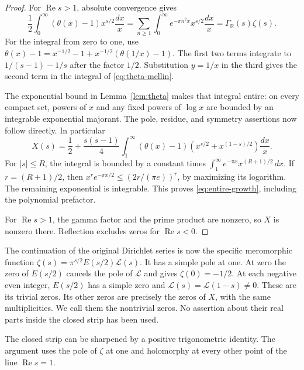 \documentclass[11pt]{article}
\theoremstyle{definition}
\theoremstyle{remark}
\numberwithin{equation}{section}
\newcommand{\R}{\mathbb R}
\begin{document}
\begin{proof}
For $\operatorname{Re}s>1$, absolute convergence gives
\[
 \frac12\int_0^\infty(\theta(x)-1)x^{s/2}\frac{dx}{x}
 =\sum_{n\geq1}\int_0^\infty e^{-\pi n^2x}x^{s/2}\frac{dx}{x}
 =\Gamma_{\R}(s)\zeta(s).
\]
For the integral from zero to one, use
$\theta(x)-1=x^{-1/2}-1+x^{-1/2}(\theta(1/x)-1)$.
The first two terms integrate to $1/(s-1)-1/s$ after the factor $1/2$.
Substitution $y=1/x$ in the third gives the second term in the integral
of \eqref{eq:theta-mellin}.

The exponential bound in Lemma~\ref{lem:theta} makes that integral entire:
on every compact set, powers of $x$ and any fixed powers of $\log x$ are
bounded by an integrable exponential majorant.
The pole, residue, and symmetry assertions now follow directly.
In particular
\[
 X(s)=\frac12+\frac{s(s-1)}4
       \int_1^\infty(\theta(x)-1)
             \left(x^{s/2}+x^{(1-s)/2}\right)\frac{dx}{x}.
\]
For $|s|\leq R$, the integral is bounded by a constant times
$\int_1^\infty e^{-\pi x}x^{(R+1)/2}\,dx$.
If $r=(R+1)/2$, then
$x^r e^{-\pi x/2}\leq(2r/(\pi e))^r$, by maximizing its logarithm.
The remaining exponential is integrable.  This proves
\eqref{eq:entire-growth}, including the polynomial prefactor.

For $\operatorname{Re}s>1$, the gamma factor and the prime product are
nonzero, so $X$ is nonzero there.  Reflection excludes zeros for
$\operatorname{Re}s<0$.
\end{proof}

The continuation of the original Dirichlet series is now the specific
meromorphic function $\zeta(s)=\pi^{s/2}E(s/2)\mathcal L(s)$.
It has a simple pole at one.  At zero the zero of $E(s/2)$ cancels the
pole of $\mathcal L$ and gives $\zeta(0)=-1/2$.
At each negative even integer, $E(s/2)$ has a simple zero and
$\mathcal L(s)=\mathcal L(1-s)\ne0$.
These are its trivial zeros.  Its other zeros are precisely the zeros of
$X$, with the same multiplicities.  We call them the nontrivial zeros.
No assertion about their real parts inside the closed strip has been used.

The closed strip can be sharpened by a positive trigonometric identity.
The argument uses the pole of $\zeta$ at one and holomorphy at every
other point of the line $\operatorname{Re}s=1$.
\end{document}
